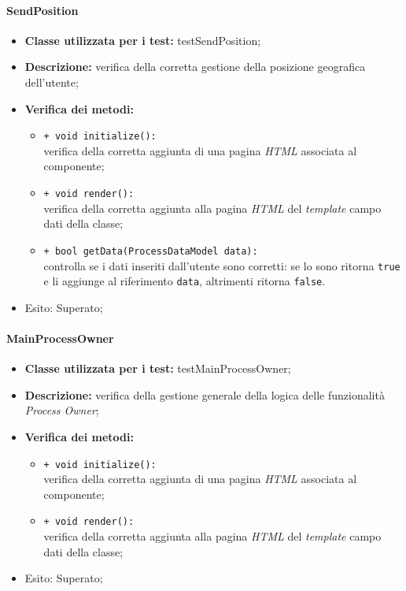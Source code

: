 \paragraph{SendPosition}
\begin{flushleft}
\begin{itemize}
\item \textbf{Classe utilizzata per i test:} testSendPosition;
\item \textbf{Descrizione:} verifica della corretta gestione della posizione geografica dell'utente;
\item \textbf{Verifica dei metodi:}
\begin{sloppypar}
\begin{itemize}
\item \texttt{+ void initialize():}\\ verifica della corretta aggiunta di una pagina \textit{HTML} associata al componente;
\item \texttt{+ void render():}\\ verifica della corretta aggiunta alla pagina \textit{HTML} del \textit{template} campo dati della classe;
\item \texttt{+ bool getData(ProcessDataModel data):}\\ controlla se i dati inseriti dall'utente sono corretti: se lo sono ritorna \texttt{true} e li aggiunge al riferimento \texttt{data}, altrimenti ritorna \texttt{false}.
\end{itemize}
\end{sloppypar}
\item Esito: Superato;
\end{itemize}
\end{flushleft}


\paragraph{MainProcessOwner}
\begin{flushleft}
\begin{itemize}
\item \textbf{Classe utilizzata per i test:} testMainProcessOwner;
\item \textbf{Descrizione:} verifica della gestione generale della logica delle funzionalità \textit{Process Owner};
\item \textbf{Verifica dei metodi:}
\begin{sloppypar}
\begin{itemize}
\item \texttt{+ void initialize():}\\ verifica della corretta aggiunta di una pagina \textit{HTML} associata al componente;
\item \texttt{+ void render():}\\ verifica della corretta aggiunta alla pagina \textit{HTML} del \textit{template} campo dati della classe;
\end{itemize}
\end{sloppypar}
\item Esito: Superato;
\end{itemize}
\end{flushleft}

